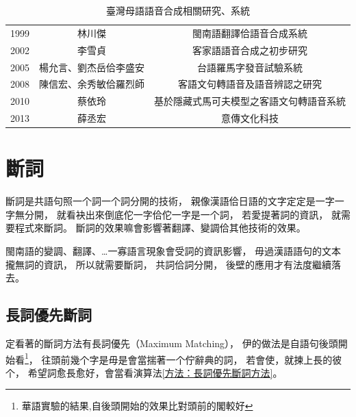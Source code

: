 \begin{table}
\caption{臺灣母語語音合成相關研究、系統}
\label{表：語音合成研究、系統}
\centering
\begin{tabular}{ccc}
1999 & 林川傑 & 閩南語翻譯佮語音合成系統\cite{中文到閩南語之線上翻譯及閩南語之語音合成} \\
2002 & 李雪貞 & 客家語語音合成之初步研究\cite{李雪貞2002客家語語音合成之初步研究} \\
2005 & 楊允言、劉杰岳佮李盛安 & 台語羅馬字發音試驗系統\cite{楊允言_台語羅馬字發音試驗系統} \\
2008 & 陳信宏、余秀敏佮羅烈師 & 客語文句轉語音及語音辨認之研究\cite{陳信宏2008客語文句轉語音及語音辨認之研究} \\
2010 & 蔡依玲 & 基於隱藏式馬可夫模型之客語文句轉語音系統\cite{蔡依玲2010基於隱藏式馬可夫模型之客語文句轉語音系統} \\
2013 & 薛丞宏 & 意傳文化科技\cite{意傳文化科技}
\end{tabular}
\end{table}

\section{斷詞}
\label{節：斷詞}
斷詞是共語句照一个詞一个詞分開的技術，
親像漢語佮日語的文字定定是一字一字無分開，
就看袂出來倒底佗一字佮佗一字是一个詞，
若愛提著詞的資訊，
就需要程式來斷詞。
斷詞的效果嘛會影響著翻譯、變調佮其他技術的效果。

閩南語的變調、翻譯、…一寡語言現象會受詞的資訊影響，
毋過漢語語句的文本攏無詞的資訊，
所以就需要斷詞，
共詞佮詞分開，
後壁的應用才有法度繼續落去。




\subsection{長詞優先斷詞}
\label{節：長詞優先斷詞}

定看著的斷詞方法有長詞優先（Maximum Matching），
伊的做法是自語句後頭開始看\footnote{華語實驗的結果,自後頭開始的效果比對頭前的閣較好}，
往頭前幾个字是毋是會當揣著一个佇辭典的詞，
若會使，就揀上長的彼个，
希望詞愈長愈好，會當看演算法\ref{方法：長詞優先斷詞方法}。

